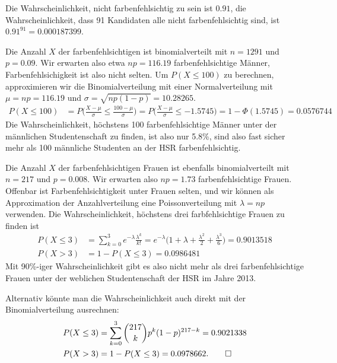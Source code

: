 \begin{loesung}
\begin{teilaufgaben}
\item
Die Wahrscheinlichkeit, nicht farbenfehlsichtig zu sein ist $0.91$, die
Wahrscheinlichkeit, dass 91 Kandidaten alle nicht farbenfehlsichtig sind,
ist $0.91^{91}=0.000187399$.
\item
Die Anzahl $X$ der farbenfehlsichtigen ist binomialverteilt mit $n=1291$ und
$p=0.09$. Wir erwarten also etwa $np=116.19$ farbenfehlsichtige Männer,
Farbenfehlsichigkeit ist also nicht selten. Um $P(X\le 100)$ zu
berechnen, approximieren wir die Binomialverteilung mit einer Normalverteilung
mit $\mu=np=116.19$ und $\sigma=\sqrt{np(1-p)}=10.28265$.
\begin{align*}
P(X\le 100)
&=
P\biggl(
\frac{X-\mu}{\sigma}\le \frac{100-\mu}{\sigma}
\biggr)
=
P\biggl(
\frac{X-\mu}{\sigma}\le -1.5745
\biggr)
=
1-\Phi(1.5745)
=
0.0576744
\end{align*}
Die Wahrscheinlichkeit, höchstens 100 farbenfehlsichtige Männer unter
der männlichen Studentenschaft zu finden, ist also nur 5.8\%, sind
also fast sicher mehr als 100 männliche Studenten an der HSR
farbenfehlsichtig.
\item
Die Anzahl $X$ der farbenfehlsichtigen Frauen ist ebenfalls binomialverteilt
mit $n=217$ und $p=0.008$. Wir erwarten also $np=1.73$ farbenfehlsichtige
Frauen. Offenbar ist Farbenfehlsichtigkeit unter Frauen selten, und wir
können als Approximation der Anzahlverteilung eine Poissonverteilung mit
$\lambda = np$ verwenden.
Die Wahrscheinlichkeit, höchstens drei farbfehlsichtige Frauen zu finden
ist
\begin{align*}
P(X\le 3)&=\sum_{k=0}^3 e^{-\lambda}\frac{\lambda^k}{k!}=
e^{-\lambda}\biggl(
1+\lambda +\frac{\lambda^2}{2}+\frac{\lambda^3}{6}
\biggr)
=
0.9013518
\\
P(X>3)&=1-P(X\le 3)=
0.0986481
\end{align*}
Mit 90\%-iger Wahrscheinlichkeit gibt es also nicht mehr als drei
farbenfehlsichtige Frauen unter der weblichen Studentenschaft
der HSR im Jahre 2013.

Alternativ könnte man die Wahrscheinlichkeit auch direkt mit der 
Binomialverteilung ausrechnen:
\begin{align*}
P(X\le 3)
&=
\sum_{k=0}^3\binom{217}{k}p^k(1-p)^{217-k}=0.9021338
\\
P(X>3)&=1-P(X\le 3)=0.0978662.
\qedhere
\end{align*}
\end{teilaufgaben}
\end{loesung}

